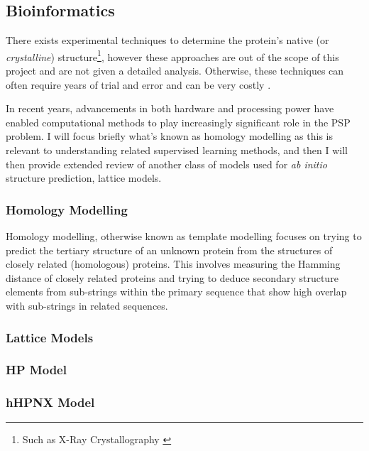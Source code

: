 \subsection{Bioinformatics}
There exists experimental techniques to determine the protein's
native (or \emph{crystalline}) structure\footnote{Such as X-Ray Crystallography \cite{Chayen}},
however these approaches are out of the scope of this
project and are not given a detailed analysis. Otherwise,
these techniques can often require years of trial and error 
and can be very costly \cite{alberts}.

In recent years, advancements in both hardware and processing power
have enabled computational methods to play increasingly significant role 
in the PSP problem. I will focus briefly what's known
as homology modelling as this is relevant to understanding related
supervised learning methods, and then I will then provide extended review
of another class of models used for \emph{ab initio} structure prediction,
lattice models.
\subsubsection{Homology Modelling}
Homology modelling, otherwise known as template modelling focuses on
trying to predict the tertiary structure of an unknown protein
from the structures of closely related (homologous) proteins.
This involves measuring the Hamming distance of closely
related proteins and trying to deduce secondary structure elements
from sub-strings within the primary sequence that show high overlap
with sub-strings in related sequences. 
\subsubsection{Lattice Models}
\subsubsection{HP Model}
\subsubsection{hHPNX Model}
